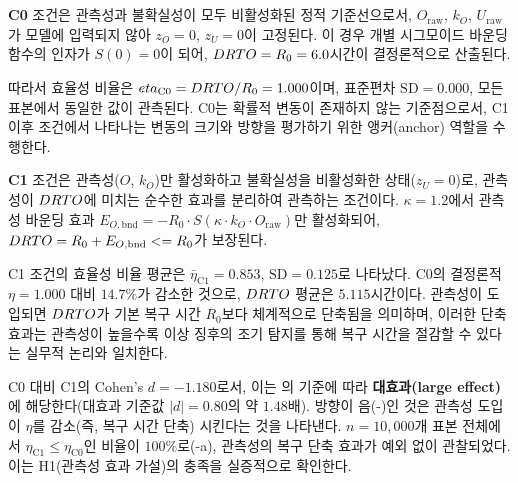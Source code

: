 

\section{}
\label{sec:result_c0c1}


\textbf{C0} 조건은 관측성과 불확실성이 모두 비활성화된 정적 기준선으로서,
$O_{\text{raw}}$, $k_O$, $U_{\text{raw}}$가 모델에 입력되지 않아
$z_O = 0$, $z_U = 0$이 고정된다. 이 경우 개별 시그모이드 바운딩 함수의
인자가 $S(0) = 0$이 되어, $DRTO = R_0 = 6.0$시간이
결정론적으로 산출된다.

따라서 효율성 비율은 $eta_{\text{C0}} = DRTO / R_0 = 1.000$이며,
표준편차 $\mathrm{SD} = 0.000$, 모든 표본에서 동일한 값이 관측된다.
C0는 확률적 변동이 존재하지 않는 기준점으로서, C1 이후 조건에서
나타나는 변동의 크기와 방향을 평가하기 위한 앵커(anchor) 역할을 수행한다.



\textbf{C1} 조건은 관측성($O$, $k_O$)만 활성화하고 불확실성을 비활성화한
상태($z_U = 0$)로, 관측성이 $DRTO$에 미치는 순수한 효과를 분리하여
관측하는 조건이다.
$\kappa = 1.2$에서 관측성 바운딩 효과 $E_{O,\text{bnd}} = -R_0 \cdot S(\kappa \cdot k_O \cdot O_{\text{raw}})$만
활성화되어, $DRTO = R_0 + E_{O,\text{bnd}} <= R_0$가 보장된다.

 C1 조건의 효율성 비율 평균은 $\bar{\eta}_{\text{C1}} = 0.853$,
$\mathrm{SD} = 0.125$로 나타났다.
C0의 결정론적 $\eta = 1.000$ 대비 $14.7\%$가 감소한 것으로,
$DRTO$ 평균은 $5.115$시간이다.
관측성이 도입되면 $DRTO$가 기본 복구 시간 $R_0$보다 체계적으로 단축됨을 의미하며,
이러한 단축 효과는 관측성이 높을수록 이상 징후의 조기 탐지를 통해
복구 시간을 절감할 수 있다는 실무적 논리와 일치한다.

 C0 대비 C1의 Cohen's $d = -1.180$로서, 이는 \citet{cohen1988power}의
기준에 따라 \textbf{대효과(large effect)}에 해당한다(대효과 기준값 $|d|=0.80$의 약 $1.48$배).
방향이 음(-)인 것은 관측성 도입이 $\eta$를 감소(즉, 복구 시간 단축)
시킨다는 것을 나타낸다.
$n = 10{,}000$개 표본 전체에서 $\eta_{\text{C1}} \leq \eta_{\text{C0}}$인
비율이 $100\%$로(-a), 관측성의 복구 단축 효과가 예외 없이
관찰되었다. 이는 H1(관측성 효과 가설)의 충족을 실증적으로 확인한다.


